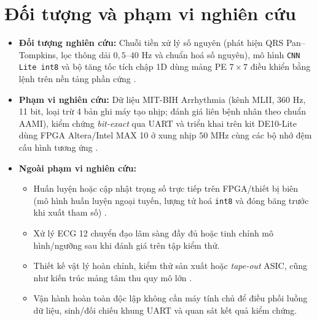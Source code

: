 \section{Đối tượng và phạm vi nghiên cứu}\label{sec:phamvi}

\begin{itemize}
	\item \textbf{Đối tượng nghiên cứu:} Chuỗi tiền xử lý số nguyên (phát hiện QRS Pan--Tompkins, lọc thông dải $0{,}5\text{--}40\text{ Hz}$ và chuẩn hoá số nguyên), mô hình \texttt{CNN Lite int8} và bộ tăng tốc tích chập 1D dùng mảng PE $7\times 7$ điều khiển bằng lệnh trên nền tảng phần cứng \cite{pantompkins1985realtime, dechazal2004automatic, jacob2018quantization, liu2025fpga1dcnn}.
	\item \textbf{Phạm vi nghiên cứu:} Dữ liệu MIT-BIH Arrhythmia (kênh MLII, $360\text{ Hz}$, 11 bit, loại trừ 4 bản ghi máy tạo nhịp; đánh giá liên bệnh nhân theo chuẩn AAMI), kiểm chứng \emph{bit-exact} qua UART và triển khai trên kit DE10-Lite dùng FPGA Altera/Intel MAX 10 ở xung nhịp $50\text{ MHz}$ cùng các bộ nhớ đệm cấu hình tương ứng \cite{moody2001impact, aami2012ec57, li2026lightweight}.
	\item \textbf{Ngoài phạm vi nghiên cứu:}
	\begin{itemize}
		\item Huấn luyện hoặc cập nhật trọng số trực tiếp trên FPGA/thiết bị biên (mô hình huấn luyện ngoại tuyến, lượng tử hoá \texttt{int8} và đóng băng trước khi xuất tham số) \cite{jacob2018quantization}.
		\item Xử lý ECG 12 chuyển đạo lâm sàng đầy đủ hoặc tinh chỉnh mô hình/ngưỡng sau khi đánh giá trên tập kiểm thử.
		\item Thiết kế vật lý hoàn chỉnh, kiểm thử sản xuất hoặc \emph{tape-out} ASIC, cũng như kiến trúc mảng tâm thu quy mô lớn \cite{kung1982systolic, chen2017eyeriss, hariri2026hardware}.
		\item Vận hành hoàn toàn độc lập không cần máy tính chủ để điều phối luồng dữ liệu, sinh/đối chiếu khung UART và quan sát kết quả kiểm chứng.
	\end{itemize}
\end{itemize}
